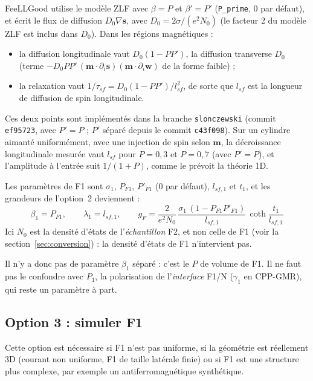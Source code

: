 \documentclass[11pt,a4paper]{article}
\newcommand{\vm}{\bm{m}}
\newcommand{\vs}{\bm{s}}
\begin{document}
FeeLLGood utilise le modèle ZLF avec $\beta = P$ et $\beta' = P'$
(\texttt{P\_prime}, 0 par défaut), et écrit le flux
de diffusion $D_0\nabla\vs$, avec $D_0 = 2\sigma/(e^2N_0)$ (le facteur 2 du
modèle ZLF est inclus dans $D_0$). Dans les régions magnétiques :
\begin{itemize}
  \item la diffusion longitudinale vaut $D_0(1-PP')$, la diffusion
    transverse $D_0$ (terme $-D_0PP'\,(\vm\cdot\partial_i\vs)
    (\vm\cdot\partial_i\bm{w})$ de la forme faible) ;
  \item la relaxation vaut $1/\tau_{sf} = D_0(1-PP')/l_{sf}^2$, de sorte
    que $l_{sf}$ est la longueur de diffusion de spin longitudinale.
\end{itemize}
Ces deux points sont implémentés dans la branche \texttt{slonczewski}
(commit \texttt{ef95723}, avec $P'=P$ ; $P'$ séparé depuis le commit
\texttt{c43f098}). Sur un cylindre aimanté uniformément, avec une
injection de spin selon $\vm$, la décroissance longitudinale mesurée vaut
$l_{sf}$ pour $P=0{,}3$ et $P=0{,}7$ (avec $P'=P$), et l'amplitude à l'entrée suit
$1/(1+P)$, comme le prévoit la théorie 1D.

Les paramètres de F1 sont $\sigma_1$, $P_{F1}$, $P'_{F1}$ (0 par défaut),
$l_{sf,1}$ et $t_1$, et
les grandeurs de l'option~2 deviennent :
\begin{equation}
  \boxed{\;
  \beta_1 = P_{F1},\qquad
  \lambda_1 = l_{sf,1},\qquad
  g_F = \frac{2}{e^2N_0}\,
        \frac{\sigma_1\,(1-P_{F1}P'_{F1})}{l_{sf,1}}\,
        \coth\frac{t_1}{l_{sf,1}}
  \;}
  \label{eq:gF-feellgood}
\end{equation}
Ici $N_0$ est la densité d'états de l'\emph{échantillon} F2, et non celle
de F1 (voir la section~\ref{sec:conversion}) : la densité d'états de F1
n'intervient pas.

Il n'y a donc pas de paramètre $\beta_1$ séparé : c'est le $P$ de volume de
F1. Il ne faut pas le confondre avec $P_1$, la polarisation de
l'\emph{interface} F1/N ($\gamma_1$ en CPP-GMR), qui reste un paramètre à
part.

\subsection{Option 3 : simuler F1}

Cette option est nécessaire si F1 n'est pas uniforme, si la géométrie est
réellement 3D (courant non uniforme, F1 de taille latérale finie) ou si F1
est une structure plus complexe, par exemple un antiferromagnétique
synthétique.
\end{document}
